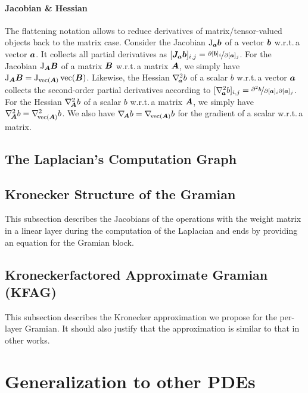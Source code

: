 \documentclass{article}
\begin{document}
\paragraph{Jacobian \& Hessian} The flattening notation allows to reduce derivatives of matrix/tensor-valued objects back to the matrix case.
Consider the Jacobian $\mathrm{J}_{{\bm{a}}}{\bm{b}}$ of a vector ${\bm{b}}$ w.r.t.\,a vector ${\bm{a}}$.
It collects all partial derivatives as $[{\bm{J}}_{{\bm{a}}}{\bm{b}}]_{i,j} = \nicefrac{\partial [{\bm{b}}]_i}{\partial [{\bm{a}}]_j}$.
For the Jacobian $\mathrm{J}_{{\bm{A}}}{\bm{B}}$ of a matrix ${\bm{B}}$ w.r.t.\,a matrix ${\bm{A}}$, we simply have $\mathrm{J}_{{\bm{A}}} {\bm{B}} = \mathrm{J}_{\operatorname{vec}( {\bm{A}} )}\operatorname{vec}({\bm{B}})$.
Likewise, the Hessian $\nabla_{\!{{\bm{a}}}}^{2}b$ of a scalar $b$ w.r.t.\,a vector ${\bm{a}}$ collects the second-order partial derivatives according to $[\nabla_{\!{{\bm{a}}}}^{2}b]_{i,j} = \nicefrac{\partial^2 b}{\partial [{\bm{a}}]_i \partial [{\bm{a}}]_j}$.
For the Hessian $\nabla_{\!{{\bm{A}}}}^{2} b$ of a scalar $b$ w.r.t.\,a matrix ${\bm{A}}$, we simply have $\nabla_{\!{{\bm{A}}}}^{2} b = \nabla_{\!{\operatorname{vec}({\bm{A}})}}^{2}b$.
We also have $\nabla_{\!{{\bm{A}}}} b = \nabla_{\!{\operatorname{vec}({\bm{A}})}} b$ for the gradient of a scalar w.r.t.\,a matrix.

\subsection{The Laplacian's Computation Graph}\label{sec:laplacian-computation-graph}


\subsection{Kronecker Structure of the Gramian}\label{sec:kronecker-structure-gramian}

This subsection describes the Jacobians of the operations with the weight matrix in
a linear layer during the computation of the Laplacian and ends by providing an
equation for the Gramian block.

\subsection{Kroneckerfactored Approximate Gramian (KFAG)}

This subsection describes the Kronecker approximation we propose for the per-layer Gramian.
It should also justify that the approximation is similar to that in other works.

\section{Generalization to other PDEs}
\end{document}
